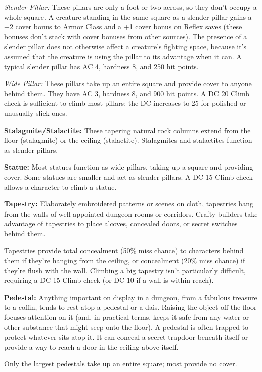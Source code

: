 \textit{Slender Pillar:} These pillars are only a foot or two across, so they don't 
occupy a whole square. A creature standing in the same square as a slender pillar 
gains a +2 cover bonus to Armor Class and a +1 cover bonus on Reflex saves (these 
bonuses don't stack with cover bonuses from other sources). The presence of a slender 
pillar does not otherwise affect a creature's fighting space, because it's assumed 
that the creature is using the pillar to its advantage when it can. A typical slender 
pillar has AC 4, hardness 8, and 250 hit points.

\textit{Wide Pillar:} These pillars take up an entire square and provide cover 
to anyone behind them. They have AC 3, hardness 8, and 900 hit points. A DC 20 
Climb check is sufficient to climb most pillars; the DC increases to 25 for polished 
or unusually slick ones. 

\textbf{Stalagmite/Stalactite:} These tapering natural rock columns extend from 
the floor (stalagmite) or the ceiling (stalactite). Stalagmites and stalactites 
function as slender pillars.

\textbf{Statue:} Most statues function as wide pillars, taking up a square and 
providing cover. Some statues are smaller and act as slender pillars. A DC 15 Climb 
check allows a character to climb a statue. 

\textbf{Tapestry:} Elaborately embroidered patterns or scenes on cloth, tapestries 
hang from the walls of well-appointed dungeon rooms or corridors. Crafty builders 
take advantage of tapestries to place alcoves, concealed doors, or secret switches 
behind them.

Tapestries provide total concealment (50\% miss chance) to characters behind them 
if they're hanging from the ceiling, or concealment (20\% miss chance) if they're 
flush with the wall. Climbing a big tapestry isn't particularly difficult, requiring 
a DC 15 Climb check (or DC 10 if a wall is within reach).

\textbf{Pedestal:} Anything important on display in a dungeon, from a fabulous 
treasure to a coffin, tends to rest atop a pedestal or a dais. Raising the object 
off the floor focuses attention on it (and, in practical terms, keeps it safe from 
any water or other substance that might seep onto the floor). A pedestal is often 
trapped to protect whatever sits atop it. It can conceal a secret trapdoor beneath 
itself or provide a way to reach a door in the ceiling above itself.

Only the largest pedestals take up an entire square; most provide no cover.

